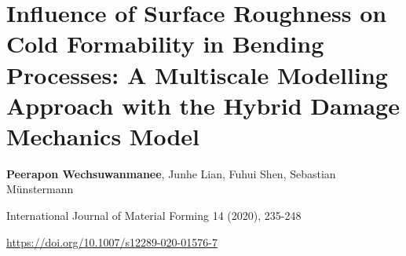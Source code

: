 \chapter[roughness]{Influence of Surface Roughness on Cold Formability in Bending Processes: A Multiscale Modelling Approach with the Hybrid Damage Mechanics Model}\label{ch:roughness}
\begin{center}

    \textbf{Peerapon Wechsuwanmanee}, Junhe Lian, Fuhui Shen, Sebastian Münstermann
    
    \vspace{20pt}
    
    International Journal of Material Forming 14 (2020), 235-248
    
    \vspace{20pt}
    
    \url{https://doi.org/10.1007/s12289-020-01576-7}
    
    \vspace{40pt}
    
\end{center}



